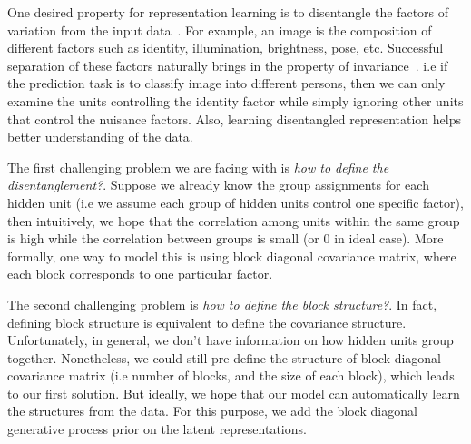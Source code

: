 One desired property for representation learning is to disentangle the factors of variation from the input data~\cite{bengio2013representation}.
For example, an image is the composition of different factors such as identity, illumination, brightness, pose, etc. Successful separation of these factors naturally brings in the property of invariance~\cite{cohen2014learning}. i.e if the prediction task is to classify image into different persons, then we can only examine the units controlling the identity factor while simply ignoring other units that control the nuisance factors. Also, learning disentangled representation helps better understanding of the data.

The first challenging problem we are facing with is \textit{how to define the disentanglement?}. Suppose we already know the group assignments for each hidden unit (i.e we assume each group of hidden units control one specific factor), then intuitively, we hope that the correlation among units within the same group is high while the correlation between groups is small (or 0 in ideal case). More formally, one way to model this is using block diagonal covariance matrix, where each block corresponds to one particular factor.

The second challenging problem is \textit{how to define the block structure?}. In fact, defining block structure is equivalent to define the covariance structure. Unfortunately, in general, we don't have information on how hidden units group together. Nonetheless, we could still pre-define the structure of block diagonal covariance matrix (i.e number of blocks, and the size of each block), which leads to our first solution. But ideally, we hope that our model can automatically learn the structures from the data. For this purpose, we add the block diagonal generative process prior on the latent representations.


